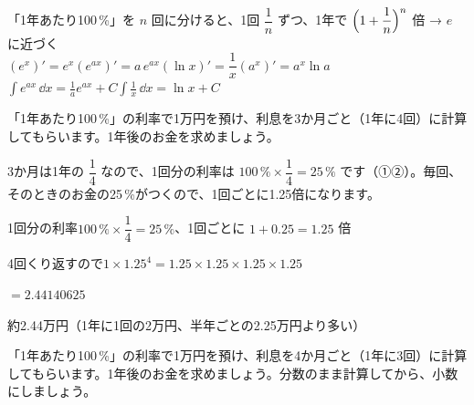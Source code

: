 {}

\begin{taisetsu}
「1年あたり100\,\%」を $n$ 回に分けると、1回 $\dfrac{1}{n}$ ずつ、1年で $\Bigl(1+\dfrac{1}{n}\Bigr)^n$ 倍 → $e$ に近づく\\
$(e^x)'=e^x$\qquad $(e^{ax})'=a\,e^{ax}$\qquad $(\ln x)'=\dfrac{1}{x}$\qquad $(a^x)'=a^x\ln a$\\
$\displaystyle\int e^{ax}\,\dd x=\frac{1}{a}e^{ax}+C$\qquad $\displaystyle\int\frac{1}{x}\,\dd x=\ln x+C$
\end{taisetsu}

\begin{kotoba}
\small
{}
\end{kotoba}


\begin{reidai}[利息を何回かに分ける]
「1年あたり100\,\%」の利率で1万円を預け、利息を3か月ごと（1年に4回）に計算してもらいます。1年後のお金を求めましょう。\par
\kangaekata 3か月は1年の $\dfrac{1}{4}$ なので、1回分の利率は $100\,\%\times\dfrac{1}{4}=25\,\%$ です（①②）。毎回、そのときのお金の25\,\%がつくので、1回ごとに1.25倍になります。\par
\shiki 1回分の利率\quad $100\,\%\times\dfrac{1}{4}=25\,\%$、1回ごとに $1+0.25=1.25$ 倍\par
\hspace*{2.6\zw}4回くり返すので\quad $1\times1.25^4=1.25\times1.25\times1.25\times1.25$\par
\hspace*{2.6\zw}$=2.44140625$\par
\kotae 約2.44万円（1年に1回の2万円、半年ごとの2.25万円より多い）
\end{reidai}

\begin{jibun}
「1年あたり100\,\%」の利率で1万円を預け、利息を4か月ごと（1年に3回）に計算してもらいます。1年後のお金を求めましょう。分数のまま計算してから、小数にしましょう。
\end{jibun}

